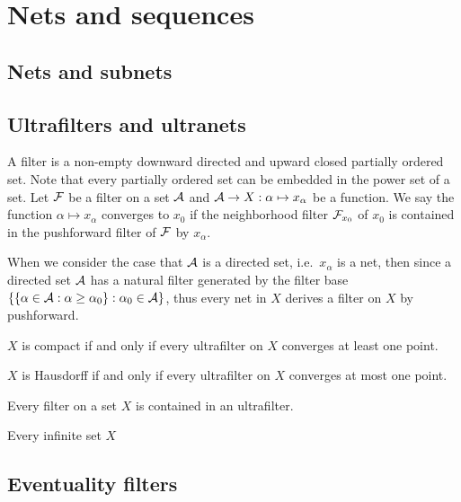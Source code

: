 \documentclass{../../large}
\begin{document}
\chapter{Nets and sequences}
\section{Nets and subnets}


\section{Ultrafilters and ultranets}

A filter is a non-empty downward directed and upward closed partially ordered set.
Note that every partially ordered set can be embedded in the power set of a set.
Let $\mathcal{F}$ be a filter on a set $\mathcal{A}$ and $\mathcal{A}\to X:\alpha\mapsto x_\alpha$ be a function.
We say the function $\alpha\mapsto x_\alpha$ converges to $x_0$ if the neighborhood filter $\mathcal{F}_{x_0}$ of $x_0$ is contained in the pushforward filter of $\mathcal{F}$ by $x_\alpha$.

When we consider the case that $\mathcal{A}$ is a directed set, i.e.~$x_\alpha$ is a net, then since a directed set $\mathcal{A}$ has a natural filter generated by the filter base $\{\{\alpha\in\mathcal{A}:\alpha\ge\alpha_0\}:\alpha_0\in\mathcal{A}\}$, thus every net in $X$ derives a filter on $X$ by pushforward.

\begin{prb}
\begin{parts}
\item $X$ is compact if and only if every ultrafilter on $X$ converges at least one point.
\item $X$ is Hausdorff if and only if every ultrafilter on $X$ converges at most one point.
\end{parts}
\end{prb}

\begin{prb}
\begin{parts}
\item Every filter on a set $X$ is contained in an ultrafilter.
\item Every infinite set $X$
\end{parts}
\end{prb}

\section{Eventuality filters}
\end{document}
